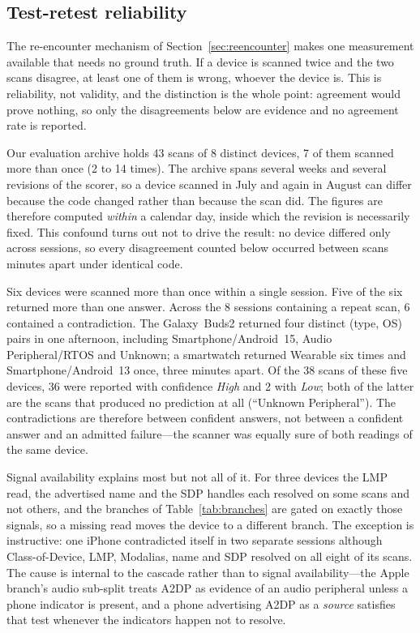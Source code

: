 \documentclass[conference]{IEEEtran}
\begin{document}
\subsection{Test-retest reliability}\label{sec:retest}
The re-encounter mechanism of Section~\ref{sec:reencounter} makes one
measurement available that needs no ground truth. If a device is scanned twice
and the two scans disagree, at least one of them is wrong, whoever the device
is. This is reliability, not validity, and the distinction is the whole point:
agreement would prove nothing, so only the disagreements below are evidence
and no agreement rate is reported.

Our evaluation archive holds 43 scans of 8 distinct devices, 7 of them scanned
more than once (2 to 14 times). The archive spans several weeks and several
revisions of the scorer, so a device scanned in July and again in August can
differ because the code changed rather than because the scan did. The figures
are therefore computed \emph{within} a calendar day, inside which the revision
is necessarily fixed. This confound turns out not to drive the result: no
device differed only across sessions, so every disagreement counted below
occurred between scans minutes apart under identical code.

Six devices were scanned more than once within a single session. Five of the
six returned more than one answer. Across the 8 sessions containing a repeat
scan, 6 contained a contradiction. The Galaxy~Buds2 returned four distinct
(type, OS) pairs in one afternoon, including Smartphone/Android~15, Audio
Peripheral/RTOS and Unknown; a smartwatch returned Wearable six times and
Smartphone/Android~13 once, three minutes apart. Of the 38 scans of these five
devices, 36 were reported with confidence \emph{High} and 2 with \emph{Low};
both of the latter are the scans that produced no prediction at all
(``Unknown Peripheral''). The contradictions are therefore between confident
answers, not between a confident answer and an admitted failure---the scanner
was equally sure of both readings of the same device.

Signal availability explains most but not all of it. For three devices the
LMP read, the advertised name and the SDP handles each resolved on some scans
and not others, and the branches of Table~\ref{tab:branches} are gated on
exactly those signals, so a missing read moves the device to a different
branch. The exception is instructive: one iPhone contradicted itself in two
separate sessions although Class-of-Device, LMP, Modalias, name and SDP
resolved on all eight of its scans. The cause is internal to the cascade
rather than to signal availability---the Apple branch's audio sub-split treats
A2DP as evidence of an audio peripheral unless a phone indicator is present,
and a phone advertising A2DP as a \emph{source} satisfies that test whenever
the indicators happen not to resolve.
\end{document}
